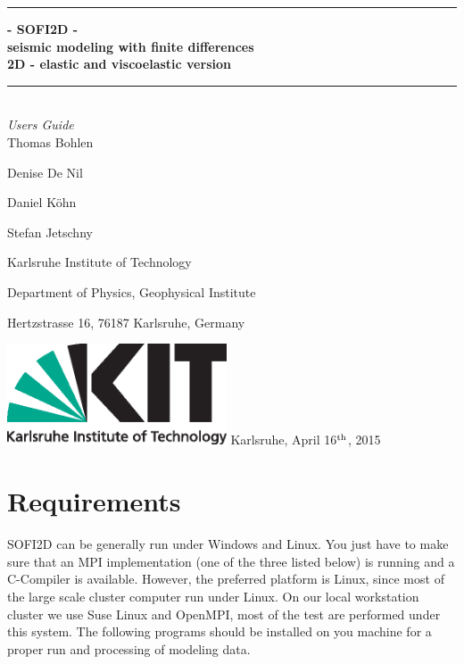 \documentclass[11pt,onecolumn,oneside]{article}
\begin{document}
\thispagestyle{empty}
\newcommand{\Rule}{\rule{\textwidth}{1mm}}
\newtheorem{theorem}{Hypothese}[section]
\begin{center}
\Rule \vspace{5mm}
\sffamily \bfseries \Huge
- SOFI2D - \\ 
seismic modeling with finite differences \\
2D - elastic and viscoelastic version
\vspace{1mm}\Rule\\
\vspace{1 cm}
\Large\emph{Users Guide}\\
\vspace{2 cm}
\large Thomas Bohlen \par
\large Denise De Nil \par
\large Daniel K\"ohn \par
\large Stefan Jetschny\par
\vspace{2 cm}

\small Karlsruhe Institute of Technology\par
\small Department of Physics, Geophysical Institute \par
\small Hertzstrasse 16, 76187 Karlsruhe, Germany \par

\vfill
\includegraphics[height=30mm]{eps/kit_logo_en_4c_positiv.eps}
\vfill
\large Karlsruhe, April 16$^{\rm{th}}$, 2015
\end{center}
\cleardoublepage
\thispagestyle{empty} 
\cleardoublepage
\thispagestyle{empty}
\ClearShipoutPicture

\tableofcontents
\newpage

\section{Requirements}
\label{requirements}

SOFI2D can be generally run under Windows and Linux. You just have to make sure that an MPI implementation (one of the three listed below) is running and a C-Compiler is available. However, the preferred platform is Linux, since most of the large scale cluster computer run under Linux. On our local workstation cluster we use Suse Linux and OpenMPI, most of the test are performed under this system. The following programs should be installed on you machine for a proper run and processing of modeling data. 
\end{document}
